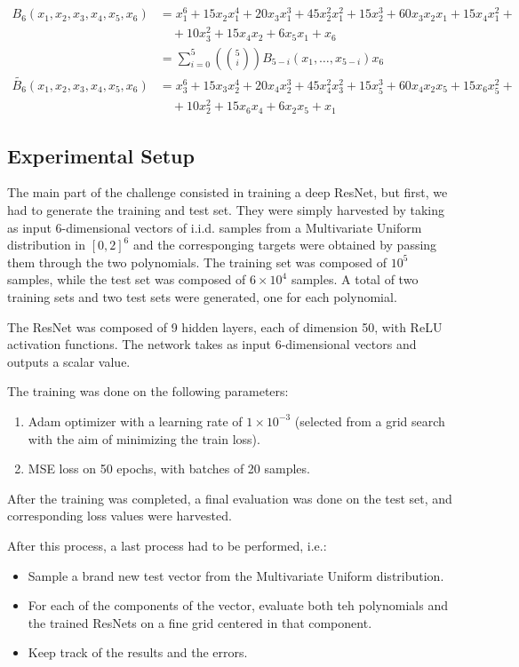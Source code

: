 \documentclass[a4paper, 10pt]{article}
\begin{document}
\begin{align*}
    B_6(x_1, x_2, x_3, x_4, x_5, x_6) &= x_1^6 + 15x_2x_1^4 + 20x_3x_1^3 + 45x_2^2x_1^2 + 15x_2^3 + 60x_3x_2x_1 + 15x_4x_1^2 + \\
        & \quad + 10x_3^2 + 15x_4x_2 + 6x_5x_1 + x_6\\
    &= \sum_{i = 0}^{5}\left(\binom{5}{i} \right)B_{5-i}(x_1, \dots, x_{5-i})x_6\\
    \tilde{B_6}(x_1, x_2, x_3, x_4, x_5, x_6) &= x_3^6 + 15x_3x_2^4 + 20x_4x_2^3 + 45x_4^2x_3^2 + 15x_5^3 + 60x_4x_2x_5 + 15x_6x_5^2 + \\
        & \quad + 10x_2^2 + 15x_6x_4 + 6x_2x_5 + x_1
\end{align*}

\subsection{Experimental Setup}
The main part of the challenge consisted in training a deep ResNet, but first, we had to generate the training and test set. 
They were simply harvested by taking as input 6-dimensional vectors of i.i.d. samples from a Multivariate Uniform distribution in $[0, 2]^{6}$ and
the corresponging targets were obtained by passing them through the two polynomials. The training set was composed of $10^5$ samples, while the test set
was composed of $6\times 10^4$ samples. A total of two training sets and two test sets were generated, one for each polynomial.

The ResNet was composed of 9 hidden layers, each of dimension 50, with ReLU activation functions. The network takes as input 6-dimensional vectors and outputs
a scalar value. 

The training was done on the following parameters:
\begin{enumerate}
    \item Adam optimizer with a learning rate of $1\times 10^{-3}$ (selected from a grid search with the aim of minimizing the train loss).
    \item MSE loss on 50 epochs, with batches of 20 samples.
\end{enumerate}

After the training was completed, a final evaluation was done on the test set, and corresponding loss values were harvested.

After this process, a last process had to be performed, i.e.:
\begin{itemize}
    \item Sample a brand new test vector from the Multivariate Uniform distribution.
    \item For each of the components of the vector, evaluate both teh polynomials and the trained ResNets on a fine grid centered in that component.
    \item Keep track of the results and the errors.
\end{itemize}
\end{document}
